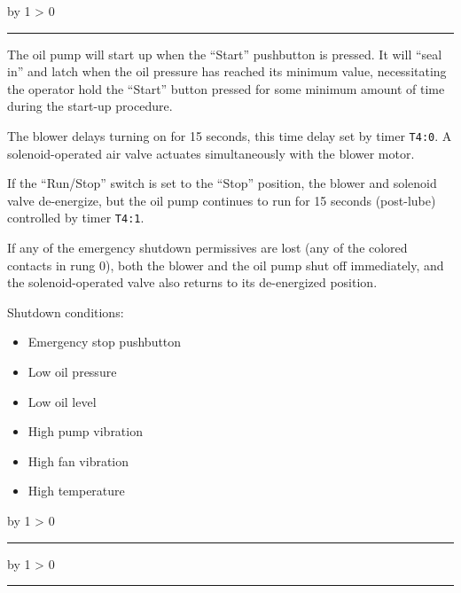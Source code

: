 \documentclass[12pt,a4paper]{article}
\def\oppgave{
            \advance\questnum by 1
            \ifnum \questnum > 0
                 \hrule
                 \vskip 3pt
                 \leftline{Oppgave \the\questnum}
                 \vskip 3pt \fi}
\def\svar{
           \advance\answnum by 1
           \ifnum \answnum > 0
                \hrule
                \vskip 3pt
                \leftline{Svar \the\answnum}
                \vskip 3pt \fi}
\def\notes{
           \advance\explnum by 1
           \ifnum \explnum > 0
                \hrule
                \vskip 3pt
                \leftline{Notes \the\explnum}
                \vskip 3pt \fi}
\begin{document}
\vskip 10pt \filbreak 





\svar{} 

The oil pump will start up when the ``Start'' pushbutton is pressed.  It will ``seal in'' and latch when the oil pressure has reached its minimum value, necessitating the operator hold the ``Start'' button pressed for some minimum amount of time during the start-up procedure.

\vskip 10pt

The blower delays turning on for 15 seconds, this time delay set by timer {\tt T4:0}.  A solenoid-operated air valve actuates simultaneously with the blower motor.

\vskip 10pt

If the ``Run/Stop'' switch is set to the ``Stop'' position, the blower and solenoid valve de-energize, but the oil pump continues to run for 15 seconds (post-lube) controlled by timer {\tt T4:1}.

\vskip 10pt

If any of the emergency shutdown permissives are lost (any of the colored contacts in rung 0), both the blower and the oil pump shut off immediately, and the solenoid-operated valve also returns to its de-energized position.

\vskip 10pt

Shutdown conditions:

\begin{itemize}
\item{} Emergency stop pushbutton
\item{} Low oil pressure
\item{} Low oil level
\item{} High pump vibration
\item{} High fan vibration
\item{} High temperature
\end{itemize}


\vskip 10pt \filbreak 





\notes{} 



\vfil \eject 



\oppgave{} 
\end{document}
